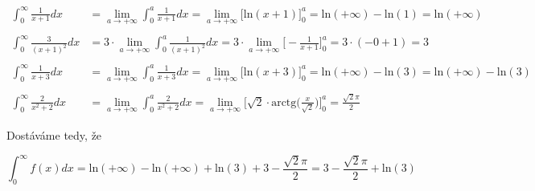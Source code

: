 \begin{align*}
\int_{0}^{\infty} \frac{1}{x+1} dx \quad &= \lim_{a \rightarrow +\infty}\int_{0}^{a} \frac{1}{x+1} dx =  \lim_{a \rightarrow + \infty}\big[\mbox{ln}(x + 1)\big]_0^a = \mbox{ln}(+\infty) - \mbox{ln}(1) = \mbox{ln}(+\infty)\nonumber \\ \quad \nonumber\\
\int_{0}^{\infty} \frac{3}{(x+1)^2} dx &= 3 \cdot \lim_{a \rightarrow +\infty}\int_{0}^{a} \frac{1}{(x + 1)^2} dx = 3 \cdot \lim_{a \rightarrow +\infty} \Big[ -\frac{1}{x+1}\Big]^a_0 = 3 \cdot(-0 + 1) = 3 \nonumber \\ \quad \nonumber\\
\int_{0}^{\infty} \frac{1}{x+3} dx \quad \, &= \lim_{a \rightarrow +\infty}\int_{0}^{a} \frac{1}{x+3}dx = \lim_{a \rightarrow +\infty}\big[\mbox{ln}(x + 3)\big]_0^a = \mbox{ln}(+\infty) - \mbox{ln}(3) = \mbox{ln}(+\infty) - \mbox{ln}(3)\nonumber \\ \quad \nonumber\\
\int_{0}^{\infty} \frac{2}{x^2+2} dx \quad &= \lim_{a \rightarrow +\infty}\int_{0}^{a} \frac{2}{x^2+2} dx =  \lim_{a \rightarrow +\infty} \Big[ \sqrt{2}\cdot\mbox{arctg}\Big(\frac{x}{\sqrt{2}}\Big)\Big]^a_0 = \frac{\sqrt{2}\pi}{2}\nonumber \quad \nonumber
\end{align*}

\noindent Dostáváme tedy, že

\begin{displaymath}
\int_{0}^{\infty} f(x)dx = \mbox{ln}(+\infty) - \mbox{ln}(+\infty) + \mbox{ln}(3) + 3 - \frac{\sqrt{2}\pi}{2} = 3 - \frac{\sqrt{2}\pi}{2} + \mbox{ln}(3)
\end{displaymath}






